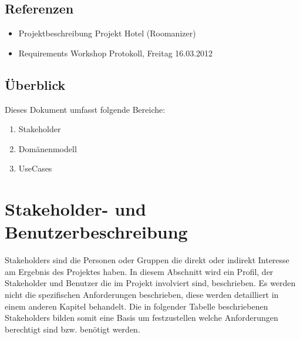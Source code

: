 \documentclass[10pt,a4paper,titlepage]{article}
\begin{document}
\subsection{Referenzen}
\begin{itemize}
	\item Projektbeschreibung Projekt Hotel (Roomanizer) 
	\item Requirements Workshop Protokoll, Freitag 16.03.2012
\end{itemize}

\subsection{Überblick}
Dieses Dokument umfasst folgende Bereiche:
\begin{enumerate}
	\item Stakeholder
	\item Domänenmodell
	\item UseCases 
\end{enumerate}

\newpage

\section{Stakeholder- und Benutzerbeschreibung}
Stakeholders sind die Personen oder Gruppen die direkt oder indirekt Interesse am Ergebnis des Projektes haben. In diesem Abschnitt wird ein Profil, der Stakeholder und Benutzer die im Projekt involviert sind, beschrieben. Es werden nicht die spezifischen Anforderungen beschrieben, diese werden detailliert in einem anderen Kapitel behandelt. Die in folgender Tabelle beschriebenen Stakeholders bilden somit eine Basis um festzustellen welche Anforderungen berechtigt sind bzw. benötigt werden. 
\end{document}
